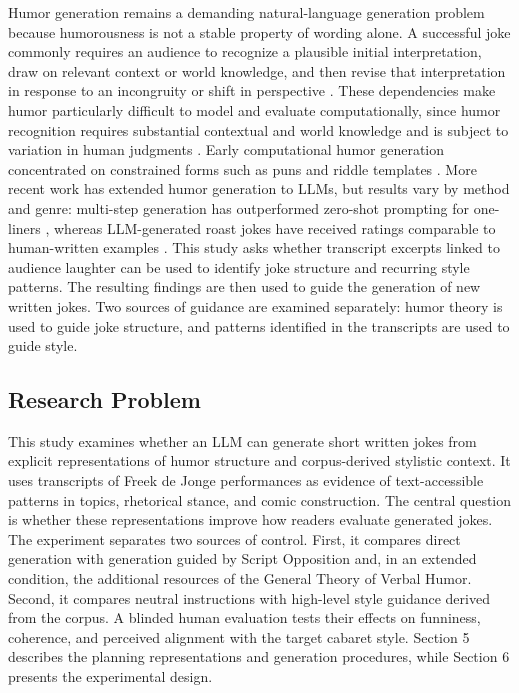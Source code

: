 \documentclass[11pt]{article}
\begin{document}
Humor generation remains a demanding natural-language generation problem because humorousness is not a stable property of wording alone. A successful joke commonly requires an audience to recognize a plausible initial interpretation, draw on relevant context or world knowledge, and then revise that interpretation in response to an incongruity or shift in perspective \citep{yus2017incongruity}. These dependencies make humor particularly difficult to model and evaluate computationally, since humor recognition requires substantial contextual and world knowledge and is subject to variation in human judgments \citep{kalloniatis2025humor}. Early computational humor generation concentrated on constrained forms such as puns and riddle templates \citep{ritchie2009,amin2020survey}. More recent work has extended humor generation to LLMs, but results vary by method and genre: multi-step generation has outperformed zero-shot prompting for one-liners \citep{tikhonov2024humor}, whereas LLM-generated roast jokes have received ratings comparable to human-written examples \citep{lemmens2026roast}. This study asks whether transcript excerpts linked to audience laughter can be used to identify joke structure and recurring style patterns. The resulting findings are then used to guide the generation of new written jokes. Two sources of guidance are examined separately: humor theory is used to guide joke structure, and patterns identified in the transcripts are used to guide style.

\subsection{Research Problem}\label{research-problem}

This study examines whether an LLM can generate short written jokes from explicit representations of humor structure and corpus-derived stylistic context. It uses transcripts of Freek de Jonge performances as evidence of text-accessible patterns in topics, rhetorical stance, and comic construction. The central question is whether these representations improve how readers evaluate generated jokes. The experiment separates two sources of control. First, it compares direct generation with generation guided by Script Opposition and, in an extended condition, the additional resources of the General Theory of Verbal Humor. Second, it compares neutral instructions with high-level style guidance derived from the corpus. A blinded human evaluation tests their effects on funniness, coherence, and perceived alignment with the target cabaret style. Section 5 describes the planning representations and generation procedures, while Section 6 presents the experimental design.
\end{document}
